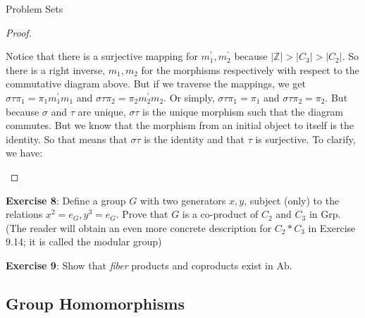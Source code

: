 \documentclass{report}
\begin{document}
\begin{exercises}{Problem Sets}
\begin{proof}
\begin{center}
\begin{tikzcd}
                    \end{tikzcd}
                \end{center}
            Notice that there is a surjective mapping for $m^{\prime}_{1}, m^{\prime}_{2}$ because $\lvert \mathbb{Z} \rvert > \lvert C_{3} \rvert > \lvert C_{2} \rvert$. So there is a right inverse, $m_{1}, m_{2}$ for the morphisms respectively with respect to the commutative diagram above. But if we traverse the mappings, we get $\sigma\tau\pi_{1} = \pi_{1}m^{\prime}_{1}m_{1}$ and $\sigma\tau\pi_{2} = \pi_{2}m^{\prime}_{2}m_{2}$. Or simply, $\sigma\tau\pi_{1} = \pi_{1}$ and $\sigma\tau\pi_{2} = \pi_{2}$. But because $\sigma$ and $\tau$ are unique, $\sigma\tau$ is the unique morphism such that the diagram commutes. But we know that the morphism from an initial object to itself is the identity. So that means that $\sigma\tau$ is the identity and that $\tau$ is surjective. To clarify, we have:
                \begin{center}
                \end{center}
        \end{proof}

    \textbf{Exercise 8}: Define a group $G$ with two generators $x, y$, subject (only) to the relations $x^{2} = e_{G}, y^{3} = e_{G}$. Prove that $G$ is a co-product of $C_{2}$ and $C_{3}$ in $\text{Grp}$. (The reader will obtain an even more concrete description for $C_{2} * C_{3}$ in Exercise 9.14; it is called the modular group)

    \textbf{Exercise 9}: Show that \textit{fiber} products and coproducts exist in $\text{Ab}$.
\end{exercises}

\begin{topic}
    \section{Group Homomorphisms}
\end{topic}
\end{document}
